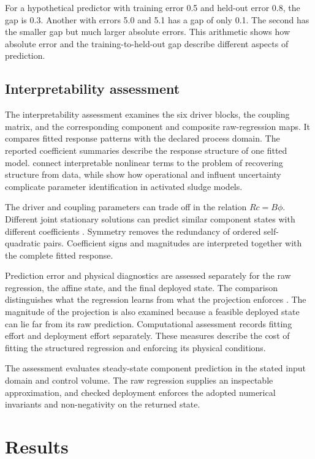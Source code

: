 For a hypothetical predictor with training error 0.5 and held-out error 0.8, the gap is 0.3. Another with errors 5.0 and 5.1 has a gap of only 0.1. The second has the smaller gap but much larger absolute errors. This arithmetic shows how absolute error and the training-to-held-out gap describe different aspects of prediction.

\subsection{Interpretability assessment}

The interpretability assessment examines the six driver blocks, the coupling matrix, and the corresponding component and composite raw-regression maps. It compares fitted response patterns with the declared process domain. The reported coefficient summaries describe the response structure of one fitted model. \citet{Brunton2016} connect interpretable nonlinear terms to the problem of recovering structure from data, while \citet{Machado2014} show how operational and influent uncertainty complicate parameter identification in activated sludge models.

The driver and coupling parameters can trade off in the relation \(Rc=B\phi\). Different joint stationary solutions can predict similar component states with different coefficients \citep{Selerio2026}. Symmetry removes the redundancy of ordered self-quadratic pairs. Coefficient signs and magnitudes are interpreted together with the complete fitted response.

Prediction error and physical diagnostics are assessed separately for the raw regression, the affine state, and the final deployed state. The comparison distinguishes what the regression learns from what the projection enforces \citep{Karniadakis2021,KircherVotsmeier2025}. The magnitude of the projection is also examined because a feasible deployed state can lie far from its raw prediction. Computational assessment records fitting effort and deployment effort separately. These measures describe the cost of fitting the structured regression and enforcing its physical conditions.

The assessment evaluates steady-state component prediction in the stated input domain and control volume. The raw regression supplies an inspectable approximation, and checked deployment enforces the adopted numerical invariants and non-negativity on the returned state.

\section{Results}
\label{sec:icsor_results}

